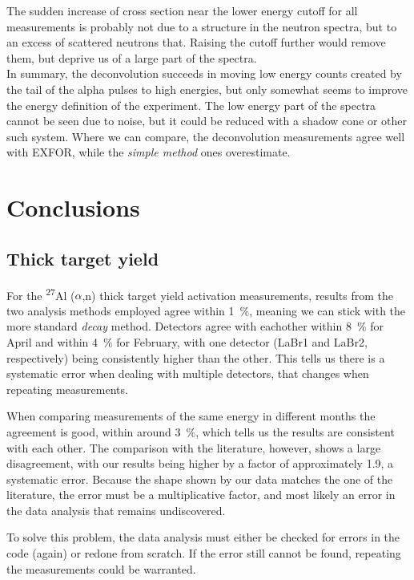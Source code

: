 \documentclass[a4paper,12pt]{report}
\newcommand{\an}{($\alpha$,n) }
\newcommand{\Aliso}{\textsuperscript{27}Al }
\begin{document}
The sudden increase of cross section near the lower energy cutoff for all measurements is probably not due to a structure in the neutron spectra, but to an excess of scattered neutrons that.
Raising the cutoff further would remove them, but deprive us of a large part of the spectra.
\\

In summary, the deconvolution succeeds in moving low energy counts created by the tail of the alpha pulses to high energies, but only somewhat seems to improve the energy definition of the experiment.
The low energy part of the spectra cannot be seen due to noise, but it could be reduced with a shadow cone or other such system.
Where we can compare, the deconvolution measurements agree well with EXFOR, while the \textit{simple method} ones overestimate.

\chapter{Conclusions}
\section{Thick target yield}
For the \Aliso\an thick target yield activation measurements, results from the two analysis methods employed agree within \qty{1}{\percent}, meaning we can stick with the more standard \textit{decay} method.
Detectors agree with eachother within \qty{8}{\percent} for April and within \qty{4}{\percent} for February, with one detector (LaBr1 and LaBr2, respectively) being consistently higher than the other.
This tells us there is a systematic error when dealing with multiple detectors, that changes when repeating measurements.

When comparing measurements of the same energy in different months the agreement is good, within around \qty{3}{\percent}, which tells us the results are consistent with each other.
The comparison with the literature, however, shows a large disagreement, with our results being higher by a factor of approximately \num{1.9}, a systematic error.
Because the shape shown by our data matches the one of the literature, the error must be a multiplicative factor, and most likely an error in the data analysis that remains undiscovered.

To solve this problem, the data analysis must either be checked for errors in the code (again) or redone from scratch.
If the error still cannot be found, repeating the measurements could be warranted.
\\
\end{document}
